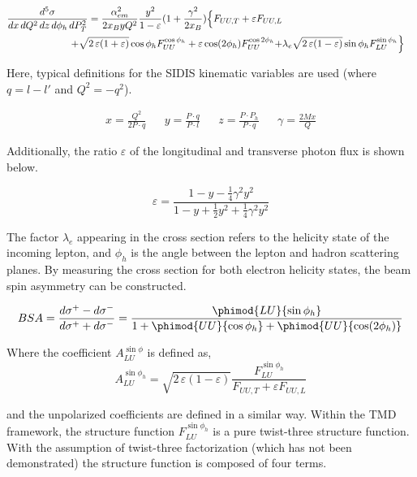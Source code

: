 \begin{eqnarray}
  \frac{d^5\sigma}{dx \, dQ^{2}\, dz\, d\phi_h\, d P_{T}^2} = \frac{\alpha^2_{em}}{2x_B y Q^2} \frac{y^2}{1-\varepsilon}  ( 1+\frac{\gamma^2}{2x_B} ) \Bigl\{ F_{UU ,T} +  \varepsilon F_{UU ,L} \nonumber \\
  + \sqrt{2\,\varepsilon (1+\varepsilon)} \cos\phi_h F_{UU}^{\cos\phi_h}+ \varepsilon \cos(2\phi_h) F_{UU}^{\cos 2\phi_h} +& \lambda_e
\sqrt{2\,\varepsilon (1-\varepsilon)} \sin\phi_h F_{LU}^{\sin\phi_h} \Bigr\}
\end{eqnarray}

Here, typical definitions for the SIDIS kinematic variables are used (where $q = l - l'$ and $Q^{2} = -q^{2}$). 

\begin{align}
  x = \frac{Q^{2}}{2P \cdot q} && y = \frac{P \cdot q}{P \cdot l} && z = \frac{P \cdot P_{h}}{P \cdot q} && \gamma = \frac{2Mx}{Q}
\end{align}

Additionally, the ratio $\varepsilon$ of the longitudinal and transverse photon flux is shown below.

\begin{equation}
	\varepsilon = \frac{1 - y - \frac{1}{4}\gamma^2 y^2}{1 - y + \frac{1}{2}y^2 + \frac{1}{4}\gamma^2 y^2}
\end{equation}

The factor $\lambda_e$ appearing in the cross section refers to the helicity state of the incoming lepton, and $\phi_h$ is the angle between the lepton and hadron scattering planes.  By measuring the cross section for both electron helicity states, the beam spin asymmetry can be constructed.  

\begin{equation}
  BSA = \frac{d\sigma^+ - d\sigma^-}{d\sigma^+ + d\sigma^-} = \frac{\phimod{LU}{\sin\phi_h}}{1 + \phimod{UU}{\cos\phi_h} + \phimod{UU}{\cos(2\phi_h)}}
\end{equation}

Where the coefficient $A_{LU}^{\sin\phi}$ is defined as, 
\begin{equation}
  A_{LU}^{\sin\phi_h} = \sqrt{2\,\varepsilon (1-\varepsilon)} \frac{F_{LU}^{\sin\phi_h}}{F_{UU,T} + \varepsilon F_{UU,L}}
\end{equation}

and the unpolarized coefficients are defined in a similar way.  Within the TMD framework, the structure function $F_{LU}^{\sin\phi_h}$ is a pure twist-three structure function.  With the assumption of twist-three factorization (which has not been demonstrated) the structure function is composed of four terms.

